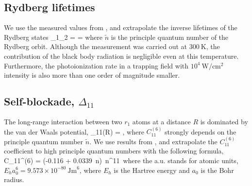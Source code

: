 \subsection{Rydberg lifetimes}
We use the measured values from \cite{Fang2011}, and extrapolate the
inverse lifetimes of the Rydberg states
\bel
	\gamma_1\approx\gamma_2 = \gamma = 
\eel
where $\tilde n$ is the principle quantum number of the Rydberg orbit. Although
the measurement was carried out at $300~\mathrm{K}$, the
contribution of the black body radiation is negligible even at this temperature.
Furthermore, the photoionization rate in a trapping field with
$10^4~\mathrm{W}/\mathrm{cm}^2$ intensity is also more than one order of magnitude
smaller.


\subsection{Self-blockade, $\Delta_{11}$}
The long-range interaction between two $r_1$ atoms at a distance $R$ is
dominated by the van der Waals potential,
\bel
\label{eq:Delta_{11}(a)} 
	\Delta_{11}(R) = ,
\eel
where $C_{11}^{(6)}$ strongly depends on the principle quantum number $\tilde
n$. We use results from \cite{Topcu2015}, and extrapolate the $C_{11}^{(6)}$
coefficient to high principle quantum numbers with the following formula,
\bel
	C_{11}^{(6)} = (-0.116 + 0.0339\, \tilde n) \,\tilde n^{11}\,
\eel
where the a.u. stands for atomic units, $E_h a_0^6 = 9.573\times
10^{-80}~\mathrm{Jm}^6$, where $E_h$ is the Hartree energy and $a_0$ is the Bohr
radius.

% 
% 

